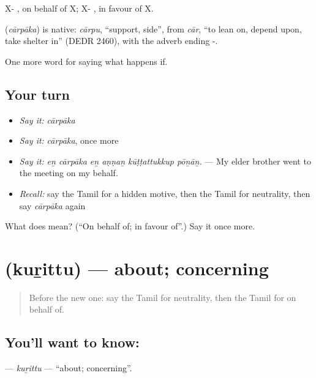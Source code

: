 X- , on behalf of X; X- , in favour of X.

\begin{cousinweb}
\textbf{} (\emph{cārpāka}) is native: \emph{cārpu}, \textquotedblleft{}support, side\textquotedblright{}, from \emph{cār}, \textquotedblleft{}to lean on, depend upon, take shelter in\textquotedblright{} (DEDR 2460), with the adverb ending -.
\end{cousinweb}

\begin{grammarlens}[title={What you've built}]
One more word for saying what happens if.
\end{grammarlens}

\subsection*{Your turn}
\begin{itemize}
\raggedright
  \item \emph{Say it:} \emph{cārpāka}
  \item \emph{Say it:} \emph{cārpāka}, once more
  \item \emph{Say it:} \emph{eṉ cārpāka eṉ aṇṇaṉ kūṭṭattukkup pōṉāṉ.} — My elder brother went to the meeting on my behalf.
  \item \emph{Recall:} say the Tamil for a hidden motive, then the Tamil for neutrality, then say \emph{cārpāka} again
\end{itemize}

\begin{tcolorbox}[breakable,colback=teal!4,colframe=teal!35!black,title={Before you move on}]
What does  mean? (\textquotedblleft{}On behalf of; in favour of\textquotedblright{}.) Say it once more.
\end{tcolorbox}
\section[\texorpdfstring{\ta{குறித்து} (kuṟittu)}{குறித்து (kuṟittu)}]{ (kuṟittu) — about; concerning}

\label{lesson:TA-C394-kurittu}



\begin{quote}
Before the new one: say the Tamil for neutrality, then the Tamil for on behalf of.
\end{quote}

\subsection*{You'll want to know: }
\textbf{} — \emph{kuṟittu} — \textquotedblleft{}about; concerning\textquotedblright{}.

